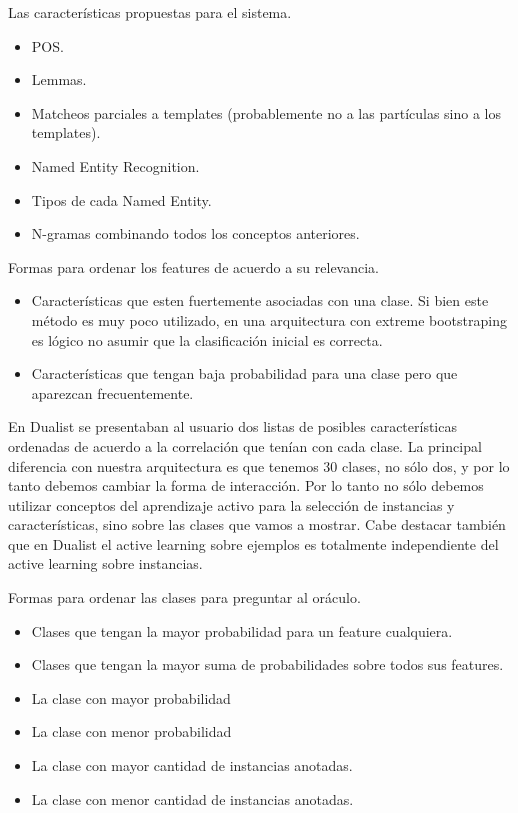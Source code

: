 Las características propuestas para el sistema.
\begin{itemize}
    \item POS.
    \item Lemmas.
    \item Matcheos parciales a templates (probablemente no a las partículas sino a los templates).
    \item Named Entity Recognition.
    \item Tipos de cada Named Entity.
    \item N-gramas combinando todos los conceptos anteriores.

\end{itemize}


Formas para ordenar los features de acuerdo a su relevancia.
\begin{itemize}
	\item Características que esten fuertemente asociadas con una clase. Si bien este método es muy poco utilizado, en una arquitectura con extreme bootstraping es lógico no asumir que la clasificación inicial es correcta.
	\item Características que tengan baja probabilidad para una clase pero que
	aparezcan frecuentemente.
\end{itemize}

En Dualist se presentaban al usuario dos listas de posibles características ordenadas de acuerdo a la correlación que tenían con cada clase. La principal diferencia con nuestra arquitectura es que tenemos 30 clases, no sólo dos, y por lo tanto debemos cambiar la forma de interacción. Por lo tanto no sólo debemos utilizar conceptos del aprendizaje activo para la selección de instancias y características, sino sobre las clases que vamos a mostrar. Cabe destacar también que en Dualist el active learning sobre ejemplos es totalmente independiente
del active learning sobre instancias.

Formas para ordenar las clases para preguntar al oráculo.
\begin{itemize}
	\item Clases que tengan la mayor probabilidad para un feature cualquiera.
	\item Clases que tengan la mayor suma de probabilidades sobre todos sus features.
	\item La clase con mayor probabilidad
	\item La clase con menor probabilidad
	\item La clase con mayor cantidad de instancias anotadas.
	\item La clase con menor cantidad de instancias anotadas.
\end{itemize}
